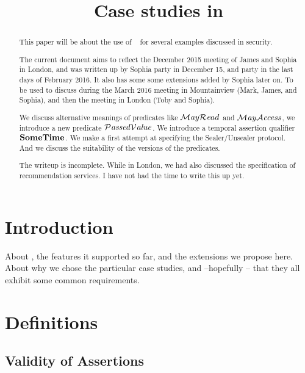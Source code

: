 \documentclass{llncs}
\begin{document}
\pagestyle{plain}

 \title{Case studies in \Chainmail}



\maketitle

\begin{abstract}
   
    This paper will be about the use of \Chainmail~ for several examples discussed in security.
    
The current document aims to reflect  the December 2015 meeting of James and Sophia in London, and was written up by Sophia party in December 15, and party in the last days of February 2016. It also has some some extensions added by Sophia later on. To be used to discuss during the March 2016 meeting in Mountainview (Mark, James, and Sophia), and then the meeting in London (Toby and Sophia).
 
 We discuss alternative meanings of predicates like $\mathcal{M}\textrm{\textit{ay}}{\mathcal{R}}\textrm{\textit{ead}}$ and $\mathcal{M}\textrm{\textit{ay}}{\mathcal{A}}\textrm{\textit{ccess}}$, we introduce a new predicate $\mathcal{P}\textrm{\textit{assed}}{\mathcal{V}}\textrm{\textit{alue}}$. We introduce a temporal assertion qualifier $\bf {SomeTime}$. We make a first attempt at specifying the Sealer/Unsealer protocol. And we discuss the suitability of the versions of the predicates.
  
The writeup is incomplete.  While in London, we had also discussed the   specification of recommendation services. I have not had the time to write this up yet.

\end{abstract}

\section{Introduction}
About \Chainmail, the features it supported so far, and the extensions we propose here. About why we chose the particular case studies, and --hopefully -- that they all exhibit some common requirements.

\section{Definitions}

\subsection{Validity of Assertions}
\end{document}
